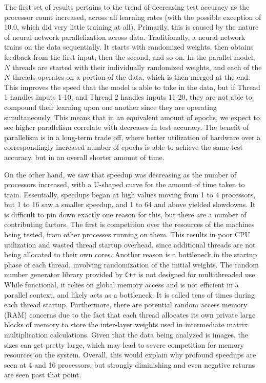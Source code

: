 \documentclass{article}
\begin{document}
The first set of results pertains to the trend of decreasing test accuracy as the processor count increased, across all learning rates (with the possible exception of 10.0, which did very little training at all). Primarily, this is caused by the nature of neural network parallelization across data. Traditionally, a neural network trains on the data sequentially. It starts with randomized weights, then obtains feedback from the first input, then the second, and so on. In the parallel model, $N$ threads are started with their individually randomized weights, and each of the $N$ threads operates on a portion of the data, which is then merged at the end. This improves the speed that the model is able to take in the data, but if Thread 1 handles inputs 1-10, and Thread 2 handles inputs 11-20, they are not able to compound their learning upon one another since they are operating simultaneously. This means that in an equivalent amount of epochs, we expect to see higher parallelism correlate with decreases in test accuracy. The benefit of parallelism is in a long-term trade off, where better utilization of hardware over a correspondingly increased number of epochs is able to achieve the same test accuracy, but in an overall shorter amount of time.

On the other hand, we saw that speedup was decreasing as the number of processors increased, with a U-shaped curve for the amount of time taken to train. Essentially, speedups began at high values moving from 1 to 4 processors, but 1 to 16 saw a smaller speedup, and 1 to 64 and above yielded slowdowns. It is difficult to pin down exactly one reason for this, but there are a number of contributing factors. The first is competition over the resources of the machines being tested, from other processes running on them. This results in poor CPU utilization and wasted thread startup overhead, since additional threads are not being allocated to their own cores. Another reason is a bottleneck in the startup phase of each thread, involving randomization of the initial weights. The random number generator library provided by \texttt{C++} is not designed for multithreaded use. While functional, it relies on global memory access and is not efficient in a parallel context, and likely acts as a bottleneck. It is called tens of times during each thread startup. Furthermore, there are potential random access memory (RAM) concerns due to the fact that each thread allocates its own private large blocks of memory to store the inter-layer weights used in intermediate matrix multiplication calculations. Given that the data being analyzed is images, the sizes can get pretty large, which may lead to severe competition for memory resources on the system. Overall, this would explain why profound speedups are seen at 4 and 16 processors, but strongly diminishing and even negative returns are seen past that point.
\end{document}
